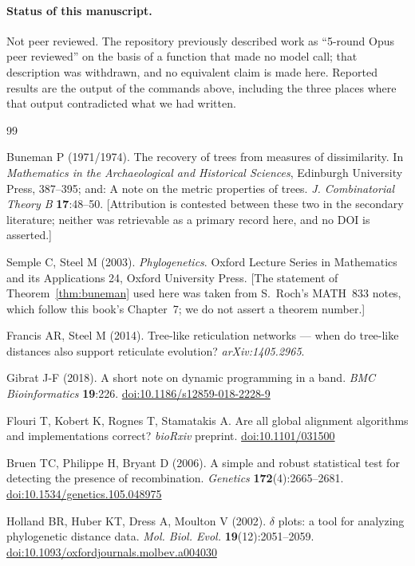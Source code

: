 \documentclass[11pt,a4paper]{article}
\theoremstyle{definition}
\theoremstyle{remark}
\begin{document}
\paragraph{Status of this manuscript.} Not peer reviewed. The repository
previously described work as ``5-round Opus peer reviewed'' on the basis of a
function that made no model call; that description was withdrawn, and no
equivalent claim is made here. Reported results are the output of the commands
above, including the three places where that output contradicted what we had
written.

\begin{thebibliography}{99}

 Buneman P (1971/1974). The recovery of trees from measures of
dissimilarity. In \emph{Mathematics in the Archaeological and Historical
Sciences}, Edinburgh University Press, 387--395; and: A note on the metric
properties of trees. \emph{J. Combinatorial Theory B} \textbf{17}:48--50.
[Attribution is contested between these two in the secondary literature; neither
was retrievable as a primary record here, and no DOI is asserted.]

 Semple C, Steel M (2003). \emph{Phylogenetics}. Oxford
Lecture Series in Mathematics and its Applications 24, Oxford University Press.
[The statement of Theorem~\ref{thm:buneman} used here was taken from S.~Roch's
MATH~833 notes, which follow this book's Chapter~7; we do not assert a theorem
number.]

 Francis AR, Steel M (2014). Tree-like reticulation
networks --- when do tree-like distances also support reticulate evolution?
\emph{arXiv:1405.2965}.

 Gibrat J-F (2018). A short note on dynamic programming in a
band. \emph{BMC Bioinformatics} \textbf{19}:226.
\href{https://doi.org/10.1186/s12859-018-2228-9}{doi:10.1186/s12859-018-2228-9}

 Flouri T, Kobert K, Rognes T, Stamatakis A. Are all global
alignment algorithms and implementations correct? \emph{bioRxiv} preprint.
\href{https://doi.org/10.1101/031500}{doi:10.1101/031500}

 Bruen TC, Philippe H, Bryant D (2006). A simple and robust
statistical test for detecting the presence of recombination. \emph{Genetics}
\textbf{172}(4):2665--2681.
\href{https://doi.org/10.1534/genetics.105.048975}{doi:10.1534/genetics.105.048975}

 Holland BR, Huber KT, Dress A, Moulton V (2002). $\delta$
plots: a tool for analyzing phylogenetic distance data. \emph{Mol. Biol. Evol.}
\textbf{19}(12):2051--2059.
\href{https://doi.org/10.1093/oxfordjournals.molbev.a004030}{doi:10.1093/oxfordjournals.molbev.a004030}


\end{thebibliography}
\end{document}
